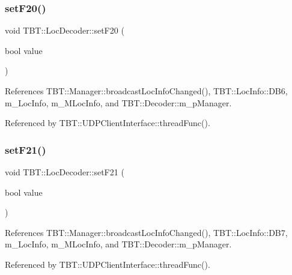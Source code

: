 \subsubsection{\texorpdfstring{set\+F20()}{setF20()}}
{\footnotesize\ttfamily void T\+B\+T\+::\+Loc\+Decoder\+::set\+F20 (\begin{DoxyParamCaption}\item[{bool}]{value }\end{DoxyParamCaption})\hspace{0.3cm}{\ttfamily [inline]}}



References T\+B\+T\+::\+Manager\+::broadcast\+Loc\+Info\+Changed(), T\+B\+T\+::\+Loc\+Info\+::\+D\+B6, m\+\_\+\+Loc\+Info, m\+\_\+\+M\+Loc\+Info, and T\+B\+T\+::\+Decoder\+::m\+\_\+p\+Manager.



Referenced by T\+B\+T\+::\+U\+D\+P\+Client\+Interface\+::thread\+Func().

\mbox{\label{classTBT_1_1LocDecoder_ab5d79049ab7e38b4d408c9627db99a6d_ab5d79049ab7e38b4d408c9627db99a6d}} 
\subsubsection{\texorpdfstring{set\+F21()}{setF21()}}
{\footnotesize\ttfamily void T\+B\+T\+::\+Loc\+Decoder\+::set\+F21 (\begin{DoxyParamCaption}\item[{bool}]{value }\end{DoxyParamCaption})\hspace{0.3cm}{\ttfamily [inline]}}



References T\+B\+T\+::\+Manager\+::broadcast\+Loc\+Info\+Changed(), T\+B\+T\+::\+Loc\+Info\+::\+D\+B7, m\+\_\+\+Loc\+Info, m\+\_\+\+M\+Loc\+Info, and T\+B\+T\+::\+Decoder\+::m\+\_\+p\+Manager.



Referenced by T\+B\+T\+::\+U\+D\+P\+Client\+Interface\+::thread\+Func().

\mbox{\label{classTBT_1_1LocDecoder_a7dc0125781c063f15dda51d03ec3e25d_a7dc0125781c063f15dda51d03ec3e25d}} 
